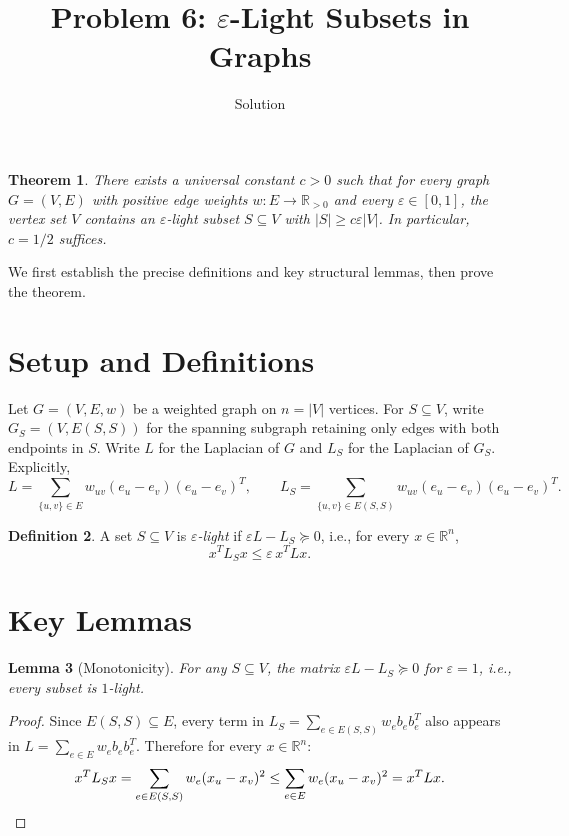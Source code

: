 \documentclass[12pt]{article}
\title{Problem 6: $\varepsilon$-Light Subsets in Graphs}
\author{Solution}
\date{}
\newtheorem{theorem}{Theorem}
\newtheorem{lemma}[theorem]{Lemma}
\theoremstyle{definition}
\newtheorem{definition}[theorem]{Definition}
\begin{document}
\maketitle

\begin{theorem}
There exists a universal constant $c > 0$ such that for every graph $G = (V,E)$ with positive edge weights $w: E \to \mathbb{R}_{>0}$ and every $\varepsilon \in [0,1]$, the vertex set $V$ contains an $\varepsilon$-light subset $S \subseteq V$ with $|S| \geq c\varepsilon|V|$. In particular, $c = 1/2$ suffices.
\end{theorem}

We first establish the precise definitions and key structural lemmas, then prove the theorem.

\section{Setup and Definitions}

Let $G = (V,E,w)$ be a weighted graph on $n = |V|$ vertices. For $S \subseteq V$, write $G_S = (V, E(S,S))$ for the spanning subgraph retaining only edges with both endpoints in $S$. Write $L$ for the Laplacian of $G$ and $L_S$ for the Laplacian of $G_S$. Explicitly,
\[
L = \sum_{\{u,v\} \in E} w_{uv}(e_u - e_v)(e_u - e_v)^T, \qquad
L_S = \sum_{\{u,v\} \in E(S,S)} w_{uv}(e_u - e_v)(e_u - e_v)^T.
\]

\begin{definition}
A set $S \subseteq V$ is \emph{$\varepsilon$-light} if $\varepsilon L - L_S \succeq 0$, i.e., for every $x \in \mathbb{R}^n$,
\[
x^T L_S x \leq \varepsilon \, x^T L x.
\]
\end{definition}

\section{Key Lemmas}

\begin{lemma}[Monotonicity]\label{lem:mono}
For any $S \subseteq V$, the matrix $\varepsilon L - L_S \succeq 0$ for $\varepsilon = 1$, i.e., every subset is $1$-light.
\end{lemma}

\begin{proof}
Since $E(S,S) \subseteq E$, every term in $L_S = \sum_{e \in E(S,S)} w_e b_e b_e^T$ also appears in $L = \sum_{e \in E} w_e b_e b_e^T$. Therefore for every $x \in \mathbb{R}^n$:
\[
x^T L_S x = \sum_{e \in E(S,S)} w_e (x_u - x_v)^2 \leq \sum_{e \in E} w_e (x_u - x_v)^2 = x^T L x. \qedhere
\]
\end{proof}
\end{document}

